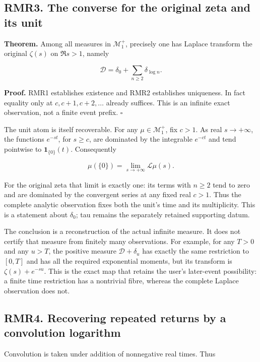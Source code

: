 \subsection{RMR3. The converse for the original zeta and its
unit}\label{rmr3.-the-converse-for-the-original-zeta-and-its-unit}

\textbf{Theorem.} Among all measures in \(\mathscr M_1^+\), precisely
one has Laplace transform the original \(\zeta(s)\) on \(\Re s>1\),
namely

\[
\boxed{\mathcal D=\delta_0+\sum_{n\ge2}\delta_{\log n}.}
\tag{RMR3.1}
\]

\textbf{Proof.} RMR1 establishes existence and RMR2 establishes
uniqueness. In fact equality only at \(c,c+1,c+2,\ldots\) already
suffices. This is an infinite exact observation, not a finite event
prefix. \(\square\)

The unit atom is itself recoverable. For any \(\mu\in\mathscr M_1^+\),
fix \(c>1\). As real \(s\to+\infty\), the functions \(e^{-st}\), for
\(s\ge c\), are dominated by the integrable \(e^{-ct}\) and tend
pointwise to \(\mathbf1_{\{0\}}(t)\). Consequently

\[
\mu(\{0\})=\lim_{s\to+\infty}\mathcal L\mu(s).
\tag{RMR3.2}
\]

For the original zeta that limit is exactly one: its terms with
\(n\ge2\) tend to zero and are dominated by the convergent series at any
fixed real \(c>1\). Thus the complete analytic observation fixes both
the unit's time and its multiplicity. This is a statement about
\(\delta_0\); tau remains the separately retained supporting datum.

The conclusion is a reconstruction of the actual infinite measure. It
does not certify that measure from finitely many observations. For
example, for any \(T>0\) and any \(u>T\), the positive measure
\(\mathcal D+\delta_u\) has exactly the same restriction to \([0,T]\)
and has all the required exponential moments, but its transform is
\(\zeta(s)+e^{-su}\). This is the exact map that retains the user's
later-event possibility: a finite time restriction has a nontrivial
fibre, whereas the complete Laplace observation does not.

\subsection{RMR4. Recovering repeated returns by a convolution
logarithm}\label{rmr4.-recovering-repeated-returns-by-a-convolution-logarithm}

Convolution is taken under addition of nonnegative real times. Thus

